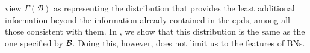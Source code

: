 \documentclass{article}
\theoremstyle{plain}
\theoremstyle{definition}
\newenvironment{example}
	{\pushQED{\qed}\renewcommand{\qedsymbol}{$\triangle$}\examplex}
	{\popQED\endexamplex%
}
\theoremstyle{remark}
\newcommand\PDGof{\Gamma}
\newcommand{\MN}{PDG}
\numberwithin{equation}{section}
\begin{document}
\begin{example}[emulating a BN]
view  $\PDGof(\mathcal B)$ as representing the
distribution that provides the least additional
information beyond the information already contained in the
        cpds, among all those consistent with them. In
        , we show that this distribution
        is the same as the one specified by $\cal B$. 
	Doing this, however, does not limit us to the features of BNs. 
	

\end{example}
\end{document}
